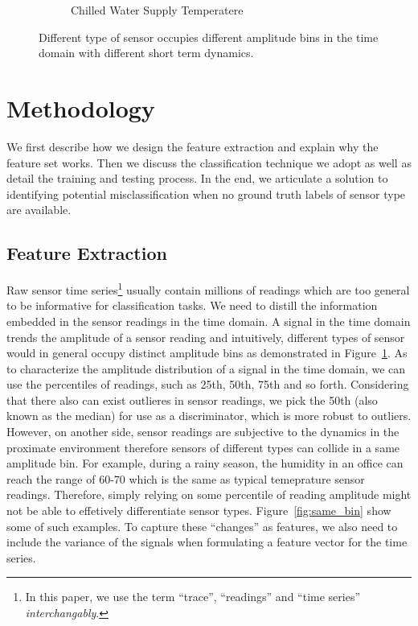 \begin{figure}[ht!]
\begin{subfigure}{0.32\textwidth}
                \caption{Chilled Water Supply Temperatere}
  \end{subfigure}
\caption{Different type of sensor occupies different amplitude bins in the time domain with different short term dynamics.}
\label{fig:example}
\end{figure}

\section{Methodology}
We first describe how we design the feature extraction and explain why the feature set works. Then we discuss
the classification technique we adopt as well as detail the training and testing process. In the end, we articulate
a solution to identifying potential misclassification when no ground truth labels of sensor type are available.

\subsection{Feature Extraction}
Raw sensor time series\footnote{In this paper, we use the term ``trace'', ``readings'' and ``time series'' \textit{interchangably}.} usually contain millions of readings which are too general to be informative for classification
tasks. We need to distill the information embedded in the sensor readings in the time domain. A signal in the time domain
trends the amplitude of a sensor reading and intuitively, different types of sensor would in general occupy distinct
amplitude bins as demonstrated in Figure~\ref{fig:example}. As to characterize the amplitude distribution of a signal in the time
domain, we can use the percentiles of readings, such as 25th, 50th, 75th and so forth. Considering that there also can
exist outlieres in sensor readings, we pick the 50th (also known as the median) for use as a discriminator, which
is more robust to outliers. However, on another side, sensor readings are subjective to the dynamics in the proximate
environment therefore sensors of different types can collide in a same amplitude bin. For example, during a rainy season, the humidity in an
office can reach the range of 60-70 which is the same as typical temeprature sensor readings. Therefore, simply relying
on some percentile of reading amplitude might not be able to effetively differentiate sensor types. Figure~\ref{fig:same_bin} show some of such
examples. To capture these ``changes'' as features, we also need to include the variance of the signals when
formulating a feature vector for the time series.

